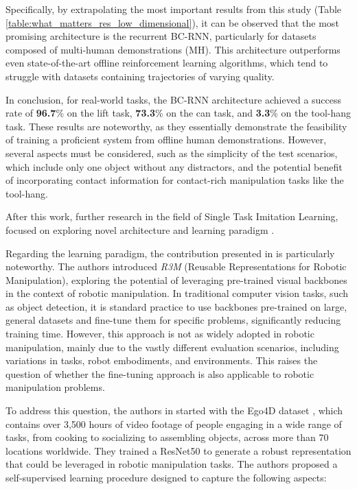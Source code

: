 Specifically, by extrapolating the most important results from this study (Table \ref{table:what_matters_res_low_dimensional}), it can be observed that the most promising architecture is the recurrent BC-RNN, particularly for datasets composed of multi-human demonstrations (MH). This architecture outperforms even state-of-the-art offline reinforcement learning algorithms, which tend to struggle with datasets containing trajectories of varying quality.

In conclusion, for real-world tasks, the BC-RNN architecture achieved a success rate of \textbf{96.7}\% on the lift task, \textbf{73.3}\% on the can task, and \textbf{3.3}\% on the tool-hang task. These results are noteworthy, as they essentially demonstrate the feasibility of training a proficient system from offline human demonstrations. However, several aspects must be considered, such as the simplicity of the test scenarios, which include only one object without any distractors, and the potential benefit of incorporating contact information for contact-rich manipulation tasks like the tool-hang.


After this work, further research in the field of Single Task Imitation Learning, focused on exploring novel architecture \cite{shafiullah2022behavior} and learning paradigm \cite{nair2022r3m,cheng2023diffusion,shi2023waypoint}. 

Regarding the learning paradigm, the contribution presented in \cite{nair2022r3m} is particularly noteworthy. The authors introduced \textit{R3M} (Reusable Representations for Robotic Manipulation), exploring the potential of leveraging pre-trained visual backbones in the context of robotic manipulation. In traditional computer vision tasks, such as object detection, it is standard practice to use backbones pre-trained on large, general datasets and fine-tune them for specific problems, significantly reducing training time. However, this approach is not as widely adopted in robotic manipulation, mainly due to the vastly different evaluation scenarios, including variations in tasks, robot embodiments, and environments. This raises the question of whether the fine-tuning approach is also applicable to robotic manipulation problems.

To address this question, the authors in \cite{nair2022r3m} started with the Ego4D dataset \cite{grauman2022ego4d}, which contains over 3,500 hours of video footage of people engaging in a wide range of tasks, from cooking to socializing to assembling objects, across more than 70 locations worldwide. They trained a ResNet50 \cite{resnet} to generate a robust representation that could be leveraged in robotic manipulation tasks. The authors proposed a self-supervised learning procedure designed to capture the following aspects:

